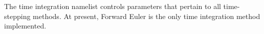 The time integration namelist controls parameters that pertain to all time-stepping methods.  At present, Forward Euler is the only time integration method implemented.

